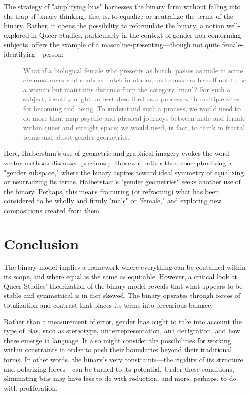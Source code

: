 \documentclass[11pt]{article}
\begin{document}
The strategy of "amplifying bias" harnesses the binary form without
falling into the trap of binary thinking, that is, to equalize or
neutralize the terms of the binary. Rather, it opens the possibility
to reformulate the binary, a notion well-explored in Queer Studies,
particularly in the context of gender non-conforming
subjects. \citet{halberstam:1998} offers the example of a
masculine-presenting---though not quite female-identifying---person:
\begin{quote}
What if a biological female who presents as butch, passes as male in
some circumstances and reads as butch in others, and considers herself
not to be a woman but maintains distance from the category 'man'? For
such a subject, identity might be best described as a process with
multiple sites for becoming and being. To understand such a process,
we would need to do more than map psychic and physical journeys
between male and female within queer and straight space; we would
need, in fact, to think in fractal terms and about gender geometries.
\end{quote}
Here, Halberstam's use of geometric and graphical imagery evokes the word vector methods discussed previously. However,
rather than conceptualizing a "gender subspace," where the binary aspires toward ideal symmetry of equalizing or neutralizing
its terms, Halberstam's "gender geometries" seeks another use of the binary. Perhaps, this means fracturing (or refracting)
what has been considered to be wholly and firmly "male" or "female," and exploring new compositions created from them.

\section{Conclusion}

The binary model implies a framework where everything can be contained
within its scope, and where equal is the same as equitable. However, a
critical look at Queer Studies' theorization of the binary model
reveals that what appears to be stable and symmetrical is in fact
skewed. The binary operates through forces of totalization and
contrast that places its terms into precarious balance.

Rather than a measurement of error, gender bias ought to take into
account the type of bias, such as stereotype, underrepresentation, and
denigration, and how these emerge in language. It also might consider
the possibilities for working within constraints in order to push their
boundaries beyond their traditional forms. In other words, the
binary's very constraints---the rigidity of its structure and
polarizing forces---can be turned to its potential. Under these
conditions, eliminating bias may have less to do with reduction, and
more, perhaps, to do with proliferation.
\end{document}
